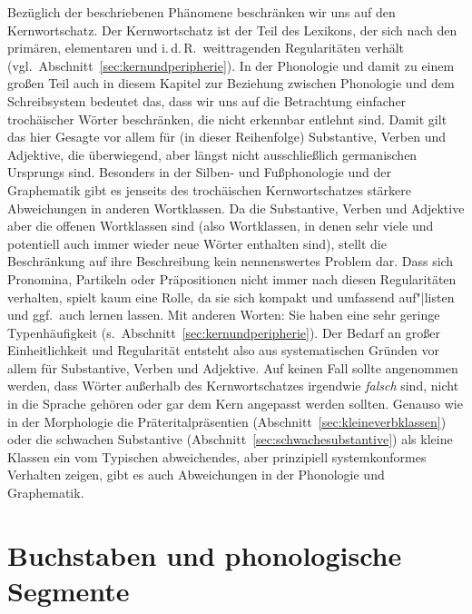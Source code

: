 Bezüglich der beschriebenen Phänomene beschränken wir uns auf den Kernwortschatz.
Der Kernwortschatz ist der Teil des Lexikons, der sich nach den primären, elementaren und i.\,d.\,R.\ weittragenden Regularitäten verhält (vgl.\ Abschnitt~\ref{sec:kernundperipherie}).
In der Phonologie und damit zu einem großen Teil auch in diesem Kapitel zur Beziehung zwischen Phonologie und dem Schreibsystem bedeutet das, dass wir uns auf die Betrachtung einfacher trochäischer Wörter beschränken, die nicht erkennbar entlehnt sind.
Damit gilt das hier Gesagte vor allem für (in dieser Reihenfolge) Substantive, Verben und Adjektive, die überwiegend, aber längst nicht ausschließlich germanischen Ursprungs sind.
Besonders in der Silben- und Fußphonologie und der Graphematik gibt es jenseits des trochäischen Kernwortschatzes stärkere Abweichungen in anderen Wortklassen.
Da die Substantive, Verben und Adjektive aber die offenen Wortklassen sind (also Wortklassen, in denen sehr viele und potentiell auch immer wieder neue Wörter enthalten sind), stellt die Beschränkung auf ihre Beschreibung kein nennenswertes Problem dar.
Dass sich Pronomina, Partikeln oder Präpositionen nicht immer nach diesen Regularitäten verhalten, spielt kaum eine Rolle, da sie sich kompakt und umfassend auf"|listen und ggf.\ auch lernen lassen.
Mit anderen Worten:
Sie haben eine sehr geringe Typenhäufigkeit (s.\ Abschnitt~\ref{sec:kernundperipherie}).
Der Bedarf an großer Einheitlichkeit und Regularität entsteht also aus systematischen Gründen vor allem für Substantive, Verben und Adjektive.
Auf keinen Fall sollte angenommen werden, dass Wörter außerhalb des Kernwortschatzes irgendwie \textit{falsch} sind, nicht in die Sprache gehören oder gar dem Kern angepasst werden sollten.
Genauso wie in der Morphologie die Präteritalpräsentien (Abschnitt~\ref{sec:kleineverbklassen}) oder die schwachen Substantive (Abschnitt~\ref{sec:schwachesubstantive}) als kleine Klassen ein vom Typischen abweichendes, aber prinzipiell systemkonformes Verhalten zeigen, gibt es auch Abweichungen in der Phonologie und Graphematik.

\Np



\section{Buchstaben und phonologische Segmente}
\label{sec:buchstabenundphonologischesegmente}

